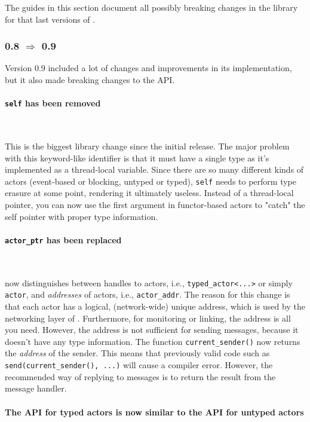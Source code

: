 The guides in this section document all possibly breaking changes in the library for that last versions of \lib.

\subsubsection{0.8 $\Rightarrow$ 0.9}

Version 0.9 included a lot of changes and improvements in its implementation, but it also made breaking changes to the API.

\paragraph{\lstinline^self^ has been removed}

~

This is the biggest library change since the initial release.
The major problem with this keyword-like identifier is that it must have a single type as it's implemented as a thread-local variable.
Since there are so many different kinds of actors (event-based or blocking, untyped or typed), \lstinline^self^ needs to perform type erasure at some point, rendering it ultimately useless.
Instead of a thread-local pointer, you can now use the first argument in functor-based actors to "catch" the self pointer with proper type information.

\paragraph{\lstinline^actor_ptr^ has been replaced}

~

\lib now distinguishes between handles to actors, i.e., \lstinline^typed_actor<...>^ or simply \lstinline^actor^, and \emph{addresses} of actors, i.e., \lstinline^actor_addr^. The reason for this change is that each actor has a logical, (network-wide) unique address, which is used by the networking layer of \lib. Furthermore, for monitoring or linking, the address is all you need. However, the address is not sufficient for sending messages, because it doesn't have any type information. The function \lstinline^current_sender()^ now returns the \emph{address} of the sender.
This means that previously valid code such as \lstinline^send(current_sender(), ...)^ will cause a compiler error.
However, the recommended way of replying to messages is to return the result from the message handler.

\paragraph{The API for typed actors is now similar to the API for untyped actors}

